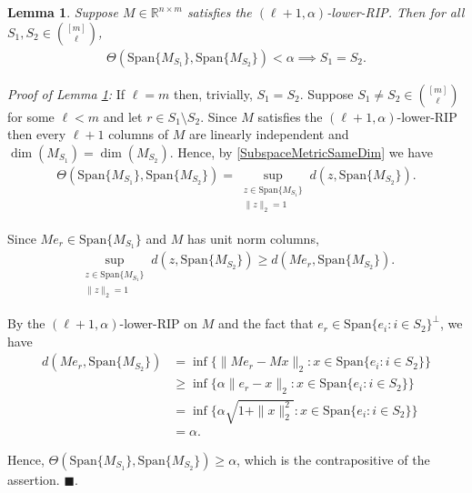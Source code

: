 \documentclass[journal,onecolumn]{IEEEtran}
\newtheorem{lemma}{Lemma}
\begin{document}

\begin{lemma}\label{RIPImpliesGapLemma}
Suppose $M \in \mathbb{R}^{n \times m}$ satisfies the $(\ell+1,\alpha)$-lower-RIP. Then for all $S_1,S_2 \in {[m] \choose \ell}$,
\begin{align}
\Theta( \text{Span}\{M_{S_1}\},\text{Span}\{M_{S_2}\}) < \alpha \implies S_1 = S_2.
\end{align}
\end{lemma}

\emph{Proof of Lemma \ref{RIPImpliesGapLemma}:} If $\ell = m$ then, trivially, $S_1 = S_2$. Suppose $S_1 \neq S_2 \in {[m] \choose \ell}$ for some $\ell < m$ and let $r \in S_1 \setminus S_2$. Since $M$ satisfies the $(\ell+1,\alpha)$-lower-RIP then every $\ell + 1$ columns of $M$ are linearly independent and $\dim(M_{S_1}) = \dim(M_{S_2})$. Hence, by \eqref{SubspaceMetricSameDim} we have
\begin{align*}
\Theta( \text{Span}\{M_{S_1}\},\text{Span}\{M_{S_2}\})
= \sup_{\substack{ z \in \text{Span}\{M_{S_1}\} \\ \|z\|_2 = 1} } d(z, \text{Span}\{M_{S_2}\}).
\end{align*}

Since $Me_r \in \text{Span}\{M_{S_1}\}$ and $M$ has unit norm columns,
\begin{align*}
\sup_{\substack{ z \in \text{Span}\{M_{S_1}\} \\ \|z\|_2 = 1} } d(z, \text{Span}\{M_{S_2}\})
\geq d(Me_r, \text{Span}\{M_{S_2}\}).
\end{align*}

By the $(\ell+1,\alpha)$-lower-RIP on $M$ and the fact that $e_r \in \text{Span}\{e_i: i \in {S_2}\}^\perp$, we have
\begin{align*}
d(Me_r, \text{Span}\{M_{S_2}\}) 
&= \inf \{ \|Me_r - Mx\|_2 : x \in \text{Span}\{e_i: i \in {S_2}\} \} \\
&\geq \inf \{ \alpha\|e_r - x \|_2 : x \in  \text{Span}\{e_i: i \in {S_2}\} \} \\
&= \inf \{ \alpha \sqrt{1 + \|x\|_2^2} : x \in  \text{Span}\{e_i: i \in {S_2}\} \} \\
&= \alpha.
\end{align*}

Hence, 
$\Theta( \text{Span}\{M_{S_1}\},\text{Span}\{M_{S_2}\}) \geq \alpha$, which is the contrapositive of the assertion. \indent $\blacksquare$.

\end{document}
